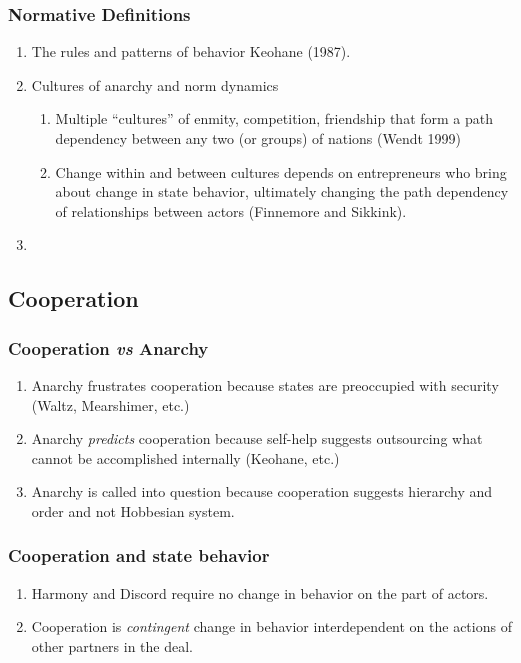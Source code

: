 \documentclass[11pt]{article}
\begin{document}
\subsubsection{Normative Definitions}
\label{sec-1-5-2}
\begin{enumerate}
\item The rules and patterns of behavior Keohane (1987).
\item Cultures of anarchy and norm dynamics
\begin{enumerate}
\item Multiple ``cultures'' of enmity, competition, friendship that form
a path dependency between any two (or groups) of nations (Wendt 1999)
\item Change within and between cultures depends on entrepreneurs who
bring about change in state behavior, ultimately changing the
path dependency of relationships between actors (Finnemore and Sikkink).
\end{enumerate}
\item 
\end{enumerate}
\subsection{Cooperation}
\label{sec-1-6}
\subsubsection{Cooperation \emph{vs} Anarchy}
\label{sec-1-6-1}
\begin{enumerate}
\item Anarchy frustrates cooperation because states are preoccupied with
security (Waltz, Mearshimer, etc.)
\item Anarchy \emph{predicts} cooperation because self-help suggests
outsourcing what cannot be accomplished internally (Keohane, etc.)
\item Anarchy is called into question because cooperation suggests
hierarchy and order and not Hobbesian system.
\end{enumerate}
\subsubsection{Cooperation and state behavior}
\label{sec-1-6-2}
\begin{enumerate}
\item Harmony and Discord require no change in behavior on the part of actors.
\item Cooperation is \emph{contingent} change in behavior interdependent on
the actions of other partners in the deal.
\end{enumerate}
\end{document}
